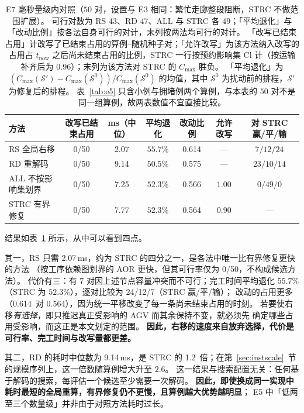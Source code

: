 \documentclass[manuscript,screen,review]{acmart}
\providecommand{\STRC}{\textsc{STRC}}
\newcommand{\NPairs}{50}
\newcommand{\FeasRone}{0/\NPairs}            %
\newcommand{\ClosureAliveFrac}{90\%}
\newcommand{\MsShift}{2.07}          %
\newcommand{\MsRedecode}{9.14}       %
\newcommand{\MsAllFuture}{7.25}      %
\newcommand{\MsCheapRtwo}{7.77}      %
\newcommand{\RedecodeRatio}{1.2}     %
\newcommand{\ShiftBad}{0/\NPairs}    %
\newcommand{\RedecodeBad}{0/\NPairs}
\newcommand{\WinVsShift}{24/12/7}    %
\newcommand{\ResFracCheapRtwo}{0.564}
\newcommand{\ResFracShift}{0.614}
\newcommand{\ResFracRedecode}{0.575}
\newcommand{\ResFracAllFuture}{0.566}
\newcommand{\ClosureShareMean}{0.90} %
\newcommand{\SegShare}{0.96}             %
\begin{document}
\begin{table}[t]
\centering
\caption{E7 毫秒量级内对照（\(\NPairs\) 对，设置与 E3 相同：繁忙走廊整段阻断，\STRC{} 不做范围扩展）。
可行对数为 RS \(43\)、RD \(47\)、ALL 与 \STRC{} 各 \(49\)；「平均退化」与「改动比例」按各法自身可行的对计，末列按两法均可行的对计。
「改写已结束占用」计改写了已结束占用的算例--随机种子对；「允许改写」为该方法纳入改写的占用占 \(t_{\mathrm{now}}\)
之后尚未结束占用的比例，\STRC{} 一行按预约影响集 \(\mathrm{Cl}\) 计（按运输补齐后为 \SegShare）；末列为该方法对 \STRC{} 的 \(C_{\max}\) 胜负。
「平均退化」为 \((C_{\max}(\mathcal{S}')-C_{\max}(\mathcal{S}^0))/C_{\max}(\mathcal{S}^0)\) 的均值，其中 \(\mathcal{S}^0\) 为扰动前的排程，\(\mathcal{S}'\) 为修复后的排程。
表~\ref{tab:e5} 只含小例与拥堵例两个算例，与本表的 \(\NPairs\) 对不是同一组算例，故两表数值不宜直接比较。}
\label{tab:cheap}
\small
\begin{tabular}{@{}lcccccc@{}}
\toprule
方法 & 改写已结束占用 & ms（中位）& 平均退化 & 改动比例 & 允许改写 & 对 \STRC{} 赢/平/输 \\
\midrule
RS 全局右移      & \ShiftBad     & \MsShift    & \(55.7\%\) & \ResFracShift    & ---   & \(7/12/24\) \\
RD 重解码        & \RedecodeBad  & \MsRedecode & \(50.5\%\) & \ResFracRedecode & ---   & \(23/10/14\) \\
ALL 不按影响集划界 & \ShiftBad     & \MsAllFuture & \(52.3\%\) & \ResFracAllFuture & \(1.00\) & \(0/49/0\) \\
\STRC{} 有界修复      & \ShiftBad     & \MsCheapRtwo & \(52.3\%\) & \ResFracCheapRtwo & \ClosureShareMean & --- \\
\bottomrule
\end{tabular}
\end{table}

结果如表~\ref{tab:cheap} 所示，从中可以看到四点。

其一，RS 只需 \MsShift\,ms，约为 \STRC{} 的四分之一，是各法中唯一比有界修复更快的方法
（按工序依赖图划界的 AOR 更快，但其可行率仅为 \FeasRone，不构成候选方法）。
代价有三：有 \(7\) 对因上述节点容量冲突而不可行；完工时间平均退化 \(55.7\%\)（\STRC{} 为 \(52.3\%\)），逐对比较为 \WinVsShift（\STRC{} 赢/平/输）；
改动的占用更多（\ResFracShift\ 对 \ResFracCheapRtwo），因为统一平移改变了每一条尚未结束占用的时刻。
若要使右移\emph{有选择}，即只推迟真正受影响的 AGV 而其余保持不变，就必须先
确定哪些占用受影响，而这正是本文划定的范围。
\textbf{因此，右移的速度来自放弃选择，代价是可行率、完工时间与改写量都更差。}

其二，RD 的耗时中位数为 \MsRedecode\,ms，是 \STRC{} 的 \RedecodeRatio\ 倍；在第~\ref{sec:instscale}~节的规模序列上，这一倍数随算例增大升至 \(2.6\)。
这一结果与搜索配置无关：任何基于解码的搜索，每评估一个候选至少需要一次解码。
\textbf{因此，即使换成同一实现中耗时最短的全局重算，有界修复仍不更慢，且算例越大优势越明显}；
E5 中「低两至三个数量级」并非由于对照方法耗时过长。
\end{document}
